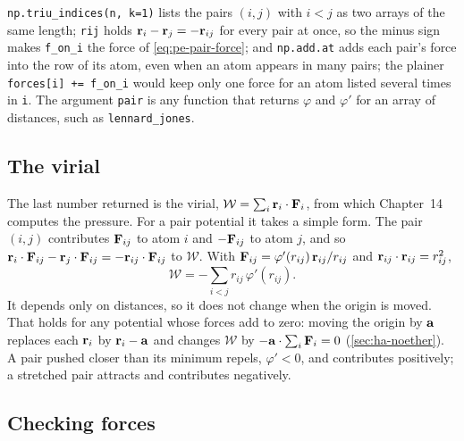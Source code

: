 \noindent \texttt{np.triu\_indices(n, k=1)} lists the pairs $(i, j)$ with
$i < j$ as two arrays of the same length; \texttt{rij} holds $\bm{\mathrm{r}}_i -
\bm{\mathrm{r}}_j = -\bm{\mathrm{r}}_{ij}$ for every pair at once, so the minus sign makes
\texttt{f\_on\_i} the force of \cref{eq:pe-pair-force}; and
\texttt{np.add.at} adds each pair's force into the row of its atom, even
when an atom appears in many pairs; the plainer \texttt{forces[i] +=
f\_on\_i} would keep only one force for an atom listed several times in
\texttt{i}. The argument \texttt{pair} is any
function that returns $\varphi$ and $\varphi'$ for an array of distances,
such as \texttt{lennard\_jones}.

\subsection*{The virial}

The last number returned is the virial, $\mathcal{W} = \sum_i\bm{\mathrm{r}}_i\cdot
\bm{\mathrm{F}}_i$, from which Chapter~14 computes the pressure. For a pair potential it
takes a simple form. The pair $(i, j)$ contributes $\bm{\mathrm{F}}_{ij}$ to atom
$i$ and $-\bm{\mathrm{F}}_{ij}$ to atom $j$, and so $\bm{\mathrm{r}}_i\cdot\bm{\mathrm{F}}_{ij} -
\bm{\mathrm{r}}_j\cdot\bm{\mathrm{F}}_{ij} = -\bm{\mathrm{r}}_{ij}\cdot\bm{\mathrm{F}}_{ij}$ to $\mathcal{W}$. With
$\bm{\mathrm{F}}_{ij} = \varphi'(r_{ij})\,\bm{\mathrm{r}}_{ij}/r_{ij}$ and $\bm{\mathrm{r}}_{ij}\cdot
\bm{\mathrm{r}}_{ij} = r_{ij}^2$,
\begin{equation}
   \mathcal{W} = -\sum_{i<j} r_{ij}\,\varphi'(r_{ij}) .
   \label{eq:pe-virial}
\end{equation}
It depends only on distances, so it does not change when the origin is
moved. That holds for any potential whose forces add to zero: moving the
origin by $\bm{\mathrm{a}}$ replaces each $\bm{\mathrm{r}}_i$ by $\bm{\mathrm{r}}_i - \bm{\mathrm{a}}$ and
changes $\mathcal{W}$ by $-\bm{\mathrm{a}}\cdot\sum_i\bm{\mathrm{F}}_i = 0$ (\cref{sec:ha-noether}).
A pair pushed closer than its minimum repels, $\varphi' < 0$, and
contributes positively; a stretched pair attracts and contributes
negatively.

\subsection*{Checking forces}

